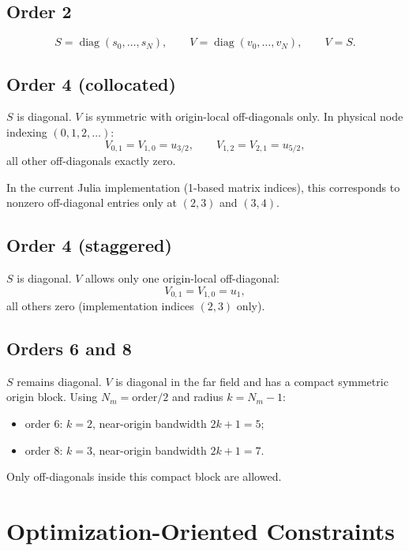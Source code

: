 \documentclass[
  aps,
  pre,
  reprint,
  superscriptaddress,
  nofootinbib
]{revtex4-2}
\newcommand{\diag}{\operatorname{diag}}
\begin{document}
\subsection{Order 2}
\begin{equation}
  S=\diag(s_0,\dots,s_N), \qquad V=\diag(v_0,\dots,v_N), \qquad V=S.
\end{equation}

\subsection{Order 4 (collocated)}
$S$ is diagonal.
$V$ is symmetric with origin-local off-diagonals only.
In physical node indexing $(0,1,2,\dots)$:
\begin{equation}
  V_{0,1}=V_{1,0}=u_{3/2}, \qquad
  V_{1,2}=V_{2,1}=u_{5/2},
\end{equation}
all other off-diagonals exactly zero.

In the current Julia implementation (1-based matrix indices), this corresponds to
nonzero off-diagonal entries only at $(2,3)$ and $(3,4)$.

\subsection{Order 4 (staggered)}
$S$ is diagonal.
$V$ allows only one origin-local off-diagonal:
\begin{equation}
  V_{0,1}=V_{1,0}=u_1,
\end{equation}
all others zero
(implementation indices $(2,3)$ only).

\subsection{Orders 6 and 8}
$S$ remains diagonal.
$V$ is diagonal in the far field and has a compact symmetric origin block.
Using $N_m=\mathrm{order}/2$ and radius $k=N_m-1$:
\begin{itemize}
  \item order 6: $k=2$, near-origin bandwidth $2k+1=5$;
  \item order 8: $k=3$, near-origin bandwidth $2k+1=7$.
\end{itemize}
Only off-diagonals inside this compact block are allowed.

\section{Optimization-Oriented Constraints}
\end{document}
